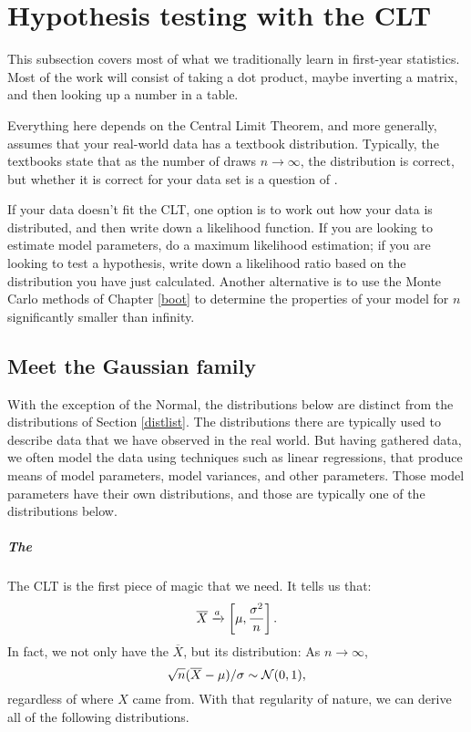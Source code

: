 \chapter[Gaussian tricks]{Hypothesis testing with the CLT} \label{gauss}

This subsection covers most of what we traditionally learn in first-year statistics. 
 Most of the work will consist of taking a dot product, maybe inverting a matrix,
and then looking up a number in a table. 

Everything here depends on the Central Limit Theorem, and more
generally, assumes that your real-world data has a textbook
distribution. Typically, the textbooks state that as the number of draws
$n \to \infty$, the distribution is correct, but whether it is correct
for your data set is a question of .

If your data doesn't fit the CLT, one option is to work out how your
data is distributed, 
and then write down a likelihood function. If you are
looking to estimate model parameters, do a maximum likelihood estimation;
if you are looking to test a hypothesis, write down a likelihood ratio
based on the distribution you have just calculated.
Another alternative is to use the Monte Carlo methods of 
Chapter \ref{boot} to determine the properties of your model for $n$ 
significantly smaller than infinity.



\section{Meet the Gaussian family} \label{dist2}
With the exception of the Normal, the distributions below are distinct
from the distributions of Section \ref{distlist}. The distributions
there
are typically used to describe data that we have observed in the real
world. But having gathered data, we often model the data using techniques
such as linear regressions, that produce means of model parameters,
model variances, and other parameters. Those model parameters have their
own distributions, and those are typically one of the distributions below.


\paragraph{The } The CLT is the first piece of magic
that we need. It tells us that:
$$\overline X \xrightarrow{a} \left[\mu,{\sigma^2\over n}\right].$$
In fact, we not only have the $\overline X$, but its distribution:
As $n\to \infty$, $$\sqrt{n} (\overline X - \mu)/\sigma \sim {\cal N}(0,1),$$ 
regardless of where $X$ came from. With that regularity of nature,
we can derive all of the following distributions.  \label{CLT}

